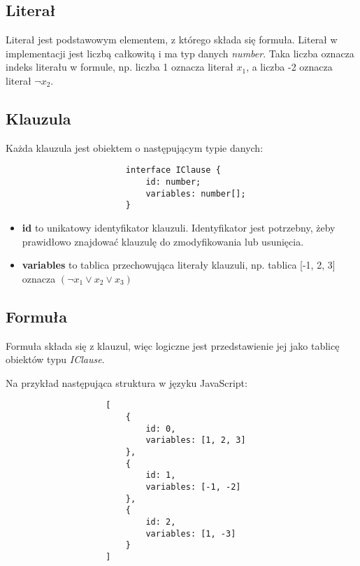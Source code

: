 \documentclass[a4paper,12pt]{book}
\theoremstyle{definition}
\begin{document}
\subsection{Literał}

Literał jest podstawowym elementem, z którego składa się formuła. Literał w implementacji jest liczbą całkowitą i ma typ danych \textit{number}. Taka liczba oznacza indeks literału w formule, np. liczba 1 oznacza literał $x_1$, a liczba -2 oznacza literał $ \neg x_2$.

\subsection{Klauzula}

Każda klauzula jest obiektem o następującym typie danych:

\begin{verbatim}
                        interface IClause {
                            id: number;
                            variables: number[];
                        }
\end{verbatim}

\begin{itemize}
    \item \textbf{id} to unikatowy identyfikator klauzuli. Identyfikator jest potrzebny, żeby prawidłowo znajdować klauzulę do zmodyfikowania lub usunięcia.
    \item \textbf{variables} to tablica przechowująca literały klauzuli, np. tablica [-1, 2, 3] oznacza $(\neg x_1 \lor x_2 \lor x_3)$
\end{itemize}

\subsection{Formuła} 

Formuła składa się z klauzul, więc logiczne jest przedstawienie jej jako tablicę obiektów typu \textit{IClause}. 

Na przykład następująca struktura w języku JavaScript:

\begin{verbatim}
                    [
                        {
                            id: 0,
                            variables: [1, 2, 3]
                        },
                        {
                            id: 1,
                            variables: [-1, -2]
                        },
                        {
                            id: 2,
                            variables: [1, -3]
                        }
                    ]
\end{verbatim}
\end{document}
